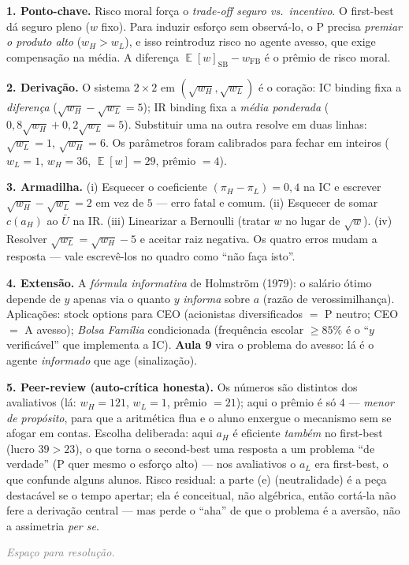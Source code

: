 \documentclass[11pt,a4paper]{article}
\DeclareMathOperator{\Esp}{\mathbb{E}}
\newcommand{\dc}[2]{#1{,}#2}
\newcommand{\passo}[1]{\smallskip\noindent\textbf{\textcolor{insper}{#1}}\quad}
\newcommand{\espacoaluno}[1]{%
  \par\smallskip\noindent\textit{\textcolor{gray}{Espaço para resolução.}}%
  \par\vspace{#1}\noindent\textcolor{insper!30}{\hrulefill}\par\medskip}
\begin{document}
\begin{gabarito}
\passo{1. Ponto-chave.} Risco moral força o \emph{trade-off seguro vs.~incentivo}. O
first-best dá seguro pleno ($w$ fixo). Para induzir esforço sem observá-lo, o P precisa
\emph{premiar o produto alto} ($w_H>w_L$), e isso reintroduz risco no agente avesso, que
exige compensação na média. A diferença $\Esp[w]_{\text{SB}} - w_{\text{FB}}$ é o prêmio
de risco moral.

\passo{2. Derivação.} O sistema $2\times2$ em $(\sqrt{w_H},\sqrt{w_L})$ é o coração: IC
binding fixa a \emph{diferença} ($\sqrt{w_H}-\sqrt{w_L}=5$); IR binding fixa a
\emph{média ponderada} ($\dc{0}{8}\sqrt{w_H}+\dc{0}{2}\sqrt{w_L}=5$). Substituir uma na
outra resolve em duas linhas: $\sqrt{w_L}=1$, $\sqrt{w_H}=6$. Os parâmetros foram
calibrados para fechar em inteiros ($w_L=1$, $w_H=36$, $\Esp[w]=29$, prêmio $=4$).

\passo{3. Armadilha.} (i) Esquecer o coeficiente $(\pi_H-\pi_L)=\dc{0}{4}$ na IC e escrever
$\sqrt{w_H}-\sqrt{w_L}=2$ em vez de $5$ — erro fatal e comum. (ii) Esquecer de somar
$c(a_H)$ ao $\bar U$ na IR. (iii) Linearizar a Bernoulli (tratar $w$ no lugar de $\sqrt{w}$).
(iv) Resolver $\sqrt{w_L}=\sqrt{w_H}-5$ e aceitar raiz negativa. Os quatro erros mudam a
resposta — vale escrevê-los no quadro como ``não faça isto''.

\passo{4. Extensão.} A \emph{fórmula informativa} de Holmström (1979): o salário ótimo
depende de $y$ apenas via o quanto $y$ \emph{informa} sobre $a$ (razão de
verossimilhança). Aplicações: stock options para CEO (acionistas diversificados $=$ P
neutro; CEO $=$ A avesso); \emph{Bolsa Família} condicionada (frequência escolar
$\ge 85\%$ é o ``$y$ verificável'' que implementa a IC). \textbf{Aula 9} vira o problema do
avesso: lá é o agente \emph{informado} que age (sinalização).

\passo{5. Peer-review (auto-crítica honesta).} Os números são distintos dos avaliativos
(lá: $w_H=121$, $w_L=1$, prêmio $=21$); aqui o prêmio é só $4$ — \emph{menor de propósito},
para que a aritmética flua e o aluno enxergue o mecanismo sem se afogar em contas. Escolha
deliberada: aqui $a_H$ é eficiente \emph{também} no first-best (lucro $39>23$), o que torna
o second-best uma resposta a um problema ``de verdade'' (P quer mesmo o esforço alto) — nos
avaliativos o $a_L$ era first-best, o que confunde alguns alunos. Risco residual: a parte
(e) (neutralidade) é a peça destacável se o tempo apertar; ela é conceitual, não algébrica,
então cortá-la não fere a derivação central — mas perde o ``aha'' de que o problema é a
aversão, não a assimetria \emph{per se}.
\end{gabarito}
\else
\espacoaluno{85mm}
\fi
\end{document}
